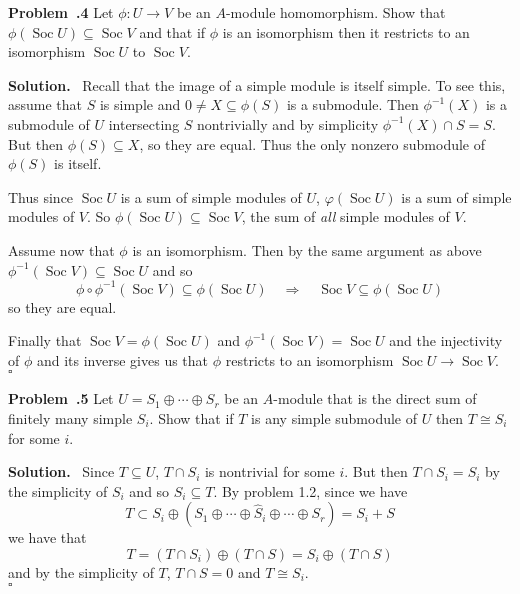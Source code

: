 \documentclass[12pt]{article}
\DeclareMathOperator{\Soc}{Soc}
\newenvironment{prob}[1]{\par\smallskip
	\noindent\begin{mdframed}\small \textbf{Problem~\thesection.#1} \rmfamily\quad}{\end{mdframed}\medskip}
\newenvironment{sol}{\noindent \textbf{Solution.} \,}{\\\hspace*{\fill}$\square$\medskip}
\begin{document}
\begin{prob}{4}
	Let $\phi:U\to V$ be an $A$-module homomorphism. Show that $\phi(\Soc U)\subseteq \Soc V$ and that if $\phi$ is an isomorphism then it restricts to an isomorphism $\Soc U$ to $\Soc V$.
\end{prob}
\begin{sol}
	Recall that the image of a simple module is itself simple. To see this, assume that $S$ is simple and $0\ne X\subseteq \phi(S)$ is a submodule. Then $\phi^{-1}(X)$ is a submodule of $U$ intersecting $S$ nontrivially and by simplicity $\phi^{-1}(X)\cap S=S$. But then $\phi(S)\subseteq X$, so they are equal. Thus the only nonzero submodule of $\phi(S)$ is itself.
	
	Thus since $\Soc U$ is a sum of simple modules of $U$, $\varphi(\Soc U)$ is a sum of simple modules of $V$. So $\phi(\Soc U)\subseteq \Soc V$, the sum of \textit{all} simple modules of $V$.
	
	Assume now that $\phi$ is an isomorphism. Then by the same argument as above $\phi^{-1}(\Soc V)\subseteq \Soc U$ and so
	\[\phi\circ\phi^{-1}(\Soc V)\subseteq \phi(\Soc U)\quad\Rightarrow\quad \Soc V\subseteq \phi(\Soc U)\]
	so they are equal.
	
	Finally that $\Soc V=\phi(\Soc U)$ and $\phi^{-1}(\Soc V)=\Soc U$ and the injectivity of $\phi$ and its inverse gives us that $\phi$ restricts to an isomorphism $\Soc U\to\Soc V$.
\end{sol}

\begin{prob}{5}
	Let $U=S_1\oplus\cdots \oplus S_r$ be an $A$-module that is the direct sum of finitely many simple $S_i$. Show that if $T$ is any simple submodule of $U$ then $T\cong S_i$ for some $i$.
\end{prob}
\begin{sol}
	Since $T\subseteq U$, $T\cap S_i$ is nontrivial for some $i$. But then $T\cap S_i=S_i$ by the simplicity of $S_i$ and so $S_i\subseteq T$. By problem 1.2, since we have
	\[T\subset S_i\oplus\left(S_1\oplus\cdots\oplus\hat S_i\oplus\cdots\oplus S_r\right)=S_i+S\]
	we have that
	\[T=(T\cap S_i)\oplus (T\cap S)=S_i\oplus (T\cap S)\]
	and by the simplicity of $T$, $T\cap S=0$ and $T\cong S_i$.
\end{sol}
\end{document}
